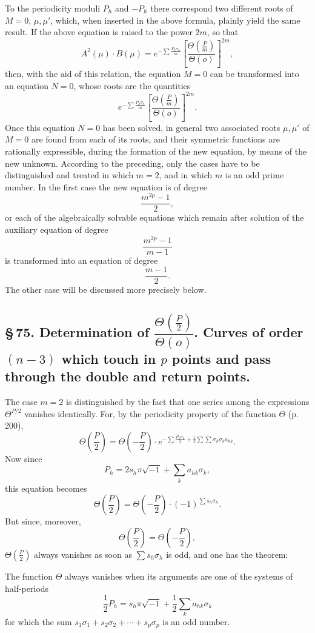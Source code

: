 \documentclass[10pt]{article}
\begin{document}
To the periodicity moduli \(P_h\) and \(-P_h\) there correspond two different roots of \(M=0\), \(\mu,\mu'\), which, when inserted in the above formula, plainly yield the same result. If the above equation is raised to the power \(2m\), so that
\[
A^2(\mu)\cdot B(\mu)
=
e^{-\sum\frac{P_h\sigma_h}{m}}
\left[\frac{\Theta\left(\frac Pm\right)}{\Theta(o)}\right]^{2m},
\]
then, with the aid of this relation, the equation \(M=0\) can be transformed into an equation \(N=0\), whose roots are the quantities
\[
e^{-\sum\frac{P_h\sigma_h}{m}}
\left[\frac{\Theta\left(\frac Pm\right)}{\Theta(o)}\right]^{2m}.
\]
Once this equation \(N=0\) has been solved, in general two associated roots \(\mu,\mu'\) of \(M=0\) are found from each of its roots, and their symmetric functions are rationally expressible, during the formation of the new equation, by means of the new unknown. According to the preceding, only the cases have to be distinguished and treated in which \(m=2\), and in which \(m\) is an odd prime number. In the first case the new equation is of degree
\[
\frac{m^{2p}-1}{2},
\]
or each of the algebraically solvable equations which remain after solution of the auxiliary equation of degree
\[
\frac{m^{2p}-1}{m-1}
\]
is transformed into an equation of degree
\[
\frac{m-1}{2}.
\]
The other case will be discussed more precisely below.

\subsection*{\S\,75. Determination of \(\dfrac{\Theta\left(\frac P2\right)}{\Theta(o)}\). Curves of order \((n-3)\) which touch in \(p\) points and pass through the double and return points.}

The case \(m=2\) is distinguished by the fact that one series among the expressions \(\Theta^{P/2}\) vanishes identically. For, by the periodicity property of the function \(\Theta\) (p. 200),
\[
\Theta\left(\frac P2\right)
=
\Theta\left(-\frac P2\right)\cdot
e^{-\sum\frac{P_h\sigma_h}{2}+\frac12\sum\sum\sigma_h\sigma_k a_{hk}}.
\]
Now since
\[
P_h=2s_h\pi\sqrt{-1}+\sum_k a_{hk}\sigma_k,
\]
this equation becomes
\[
\Theta\left(\frac P2\right)=
\Theta\left(-\frac P2\right)\cdot(-1)^{\sum s_h\sigma_h}.
\]
But since, moreover,
\[
\Theta\left(\frac P2\right)=\Theta\left(-\frac P2\right),
\]
\(\Theta\left(\frac P2\right)\) always vanishes as soon as \(\sum s_h\sigma_h\) is odd, and one has the theorem:

The function \(\Theta\) always vanishes when its arguments are one of the systems of half-periods
\[
\frac12P_h=s_h\pi\sqrt{-1}+\frac12\sum_k a_{hk}\sigma_k
\]
for which the sum \(s_1\sigma_1+s_2\sigma_2+\cdots+s_p\sigma_p\) is an odd number.
\end{document}
